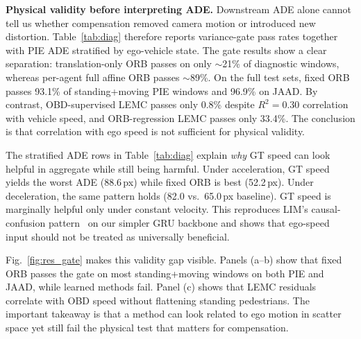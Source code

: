 \documentclass[conference]{IEEEtran}
\begin{document}
\textbf{Physical validity before interpreting ADE.}
Downstream ADE alone cannot tell us whether compensation removed camera motion or introduced new distortion.
Table~\ref{tab:diag} therefore reports variance-gate pass rates together with PIE ADE stratified by ego-vehicle state.
The gate results show a clear separation: translation-only ORB passes on only $\sim$21\% of diagnostic windows, whereas per-agent full affine ORB passes $\sim$89\%.
On the full test sets, fixed ORB passes 93.1\% of standing+moving PIE windows and 96.9\% on JAAD.
By contrast, OBD-supervised LEMC passes only 0.8\% despite $R^2{=}0.30$ correlation with vehicle speed, and ORB-regression LEMC passes only 33.4\%.
The conclusion is that correlation with ego speed is not sufficient for physical validity.

The stratified ADE rows in Table~\ref{tab:diag} explain \emph{why} GT speed can look helpful in aggregate while still being harmful.
Under acceleration, GT speed yields the worst ADE (88.6\,px) while fixed ORB is best (52.2\,px).
Under deceleration, the same pattern holds (82.0 vs.\ 65.0\,px baseline).
GT speed is marginally helpful only under constant velocity.
This reproduces LIM's causal-confusion pattern~\cite{lim2025tits} on our simpler GRU backbone and shows that ego-speed input should not be treated as universally beneficial.

Fig.~\ref{fig:res_gate} makes this validity gap visible.
Panels (a--b) show that fixed ORB passes the gate on most standing+moving windows on both PIE and JAAD, while learned methods fail.
Panel (c) shows that LEMC residuals correlate with OBD speed without flattening standing pedestrians.
The important takeaway is that a method can look related to ego motion in scatter space yet still fail the physical test that matters for compensation.
\end{document}
